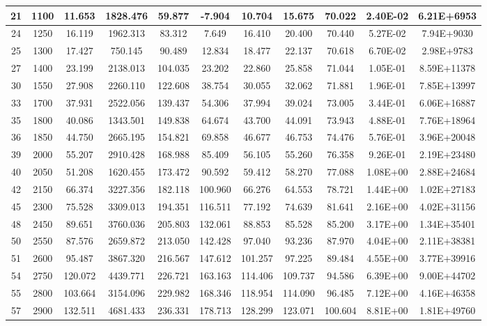 \documentclass{article}
\begin{document}
\begin{center}
\begin{longtable}{|c|c|c|c|c|c|c|c|c|c|c|}
21	&	1100	&	11.653	&	1828.476	&	59.877	&	-7.904	&	10.704	&	15.675	&	70.022	&	2.40E-02	&	6.21E+6953	\\	\hline
24	&	1250	&	16.119	&	1962.313	&	83.312	&	7.649	&	16.410	&	20.400	&	70.440	&	5.27E-02	&	7.94E+9030	\\	\hline
25	&	1300	&	17.427	&	750.145	&	90.489	&	12.834	&	18.477	&	22.137	&	70.618	&	6.70E-02	&	2.98E+9783	\\	\hline
27	&	1400	&	23.199	&	2138.013	&	104.035	&	23.202	&	22.860	&	25.858	&	71.044	&	1.05E-01	&	8.59E+11378	\\	\hline
30	&	1550	&	27.908	&	2260.110	&	122.608	&	38.754	&	30.055	&	32.062	&	71.881	&	1.96E-01	&	7.85E+13997	\\	\hline
33	&	1700	&	37.931	&	2522.056	&	139.437	&	54.306	&	37.994	&	39.024	&	73.005	&	3.44E-01	&	6.06E+16887	\\	\hline
35	&	1800	&	40.086	&	1343.501	&	149.838	&	64.674	&	43.700	&	44.091	&	73.943	&	4.88E-01	&	7.76E+18964	\\	\hline
36	&	1850	&	44.750	&	2665.195	&	154.821	&	69.858	&	46.677	&	46.753	&	74.476	&	5.76E-01	&	3.96E+20048	\\	\hline
39	&	2000	&	55.207	&	2910.428	&	168.988	&	85.409	&	56.105	&	55.260	&	76.358	&	9.26E-01	&	2.19E+23480	\\	\hline
40	&	2050	&	51.208	&	1620.455	&	173.472	&	90.592	&	59.412	&	58.270	&	77.088	&	1.08E+00	&	2.88E+24684	\\	\hline
42	&	2150	&	66.374	&	3227.356	&	182.118	&	100.960	&	66.276	&	64.553	&	78.721	&	1.44E+00	&	1.02E+27183	\\	\hline
45	&	2300	&	75.528	&	3309.013	&	194.351	&	116.511	&	77.192	&	74.639	&	81.641	&	2.16E+00	&	4.02E+31156	\\	\hline
48	&	2450	&	89.651	&	3760.036	&	205.803	&	132.061	&	88.853	&	85.528	&	85.200	&	3.17E+00	&	1.34E+35401	\\	\hline
50	&	2550	&	87.576	&	2659.872	&	213.050	&	142.428	&	97.040	&	93.236	&	87.970	&	4.04E+00	&	2.11E+38381	\\	\hline
51	&	2600	&	95.487	&	3867.320	&	216.567	&	147.612	&	101.257	&	97.225	&	89.484	&	4.55E+00	&	3.77E+39916	\\	\hline
54	&	2750	&	120.072	&	4439.771	&	226.721	&	163.163	&	114.406	&	109.737	&	94.586	&	6.39E+00	&	9.00E+44702	\\	\hline
55	&	2800	&	103.664	&	3154.096	&	229.982	&	168.346	&	118.954	&	114.090	&	96.485	&	7.12E+00	&	4.16E+46358	\\	\hline
57	&	2900	&	132.511	&	4681.433	&	236.331	&	178.713	&	128.299	&	123.071	&	100.604	&	8.81E+00	&	1.81E+49760	\\	\hline

\end{longtable}
\end{center}
\end{document}
